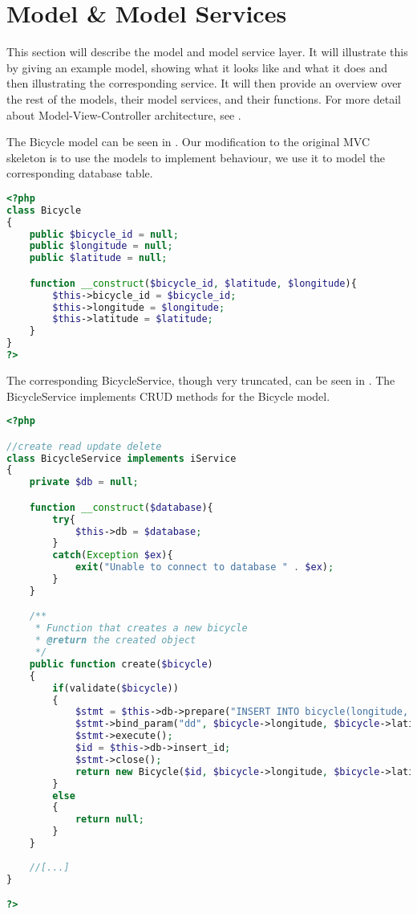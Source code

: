 \section{Model \& Model Services}
This section will describe the model and model service layer.
It will illustrate this by giving an example model, showing what it looks like and what it does and then illustrating the corresponding service.
It will then provide an overview over the rest of the models, their model services, and their functions.
For more detail about Model-View-Controller architecture, see .

The Bicycle model can be seen in .
Our modification to the original MVC skeleton is to use the models to implement behaviour, we use it to model the corresponding database table.

\begin{minipage}{\textwidth}
\begin{lstlisting}[language=php, label=lst:bicycleModel, caption={Bicycle Class}]
<?php
class Bicycle
{
    public $bicycle_id = null;
    public $longitude = null;
    public $latitude = null;

    function __construct($bicycle_id, $latitude, $longitude){
        $this->bicycle_id = $bicycle_id;
        $this->longitude = $longitude;
        $this->latitude = $latitude;
    }
}
?>
\end{lstlisting}
\end{minipage}

The corresponding BicycleService, though very truncated, can be seen in . 
The BicycleService implements CRUD methods for the Bicycle model.

\begin{lstlisting}[language=php, label=lst:bicycleService, caption={BicycleService Class}]
<?php

//create read update delete
class BicycleService implements iService
{
    private $db = null;

    function __construct($database){
        try{
            $this->db = $database;
        }
        catch(Exception $ex){
            exit("Unable to connect to database " . $ex);
        }
    }

    /**
     * Function that creates a new bicycle
     * @return the created object
     */
    public function create($bicycle)
    {
        if(validate($bicycle))
        {
            $stmt = $this->db->prepare("INSERT INTO bicycle(longitude, latitude) VALUES (?,?)");
            $stmt->bind_param("dd", $bicycle->longitude, $bicycle->latitude);
            $stmt->execute();
            $id = $this->db->insert_id;
            $stmt->close();
            return new Bicycle($id, $bicycle->longitude, $bicycle->latitude);
        }
        else
        {
            return null;
        }
    }
    
    //[...]
}

?>
\end{lstlisting}


